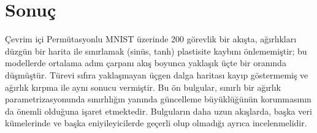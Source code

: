 \documentclass[conference,a4paper]{IEEEtran}
\begin{document}
\section{Sonuç}

Çevrim içi Permütasyonlu MNIST üzerinde 200 görevlik bir akışta, ağırlıkları düzgün bir harita ile sınırlamak
(sinüs, tanh) plastisite kaybını önlememiştir; bu modellerde ortalama adım çarpanı akış boyunca yaklaşık üçte bir
oranında düşmüştür. Türevi sıfıra yaklaşmayan üçgen dalga haritası kayıp göstermemiş ve ağırlık kırpma ile aynı
sonucu vermiştir. Bu ön bulgular, sınırlı bir ağırlık parametrizasyonunda sınırlılığın yanında güncelleme
büyüklüğünün korunmasının da önemli olduğuna işaret etmektedir. Bulguların daha uzun akışlarda, başka veri
kümelerinde ve başka eniyileyicilerde geçerli olup olmadığı ayrıca incelenmelidir.



\end{document}
